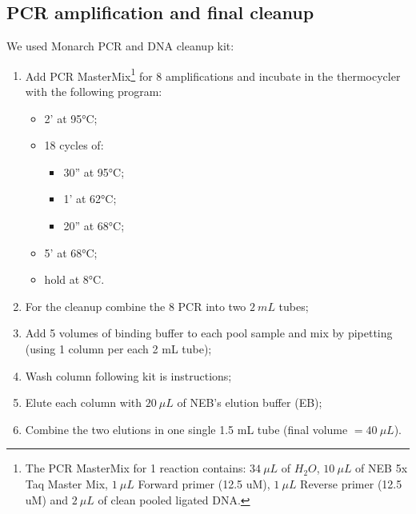 \documentclass[a4paper, 12pt]{report}
\begin{document}
\subsection{PCR amplification and final cleanup}
\vspace{-1em}
We used Monarch PCR and DNA cleanup kit:
\vspace{-1em}
\begin{enumerate}\setlength\itemsep{-0.2em}
	\item Add PCR MasterMix\footnote{The PCR MasterMix for 1 reaction contains: $34 \ \mu L$ of $H_2O$, $10 \ \mu L$ of NEB 5x Taq Master Mix, $1 \ \mu L$ Forward primer (12.5 uM), $1 \ \mu L$ Reverse primer (12.5 uM) and $2 \ \mu L$ of clean pooled ligated DNA.} for 8 amplifications and incubate in the thermocycler with the following program:
	\vspace{-0.7em}
	\begin{itemize}\setlength\itemsep{-0.2em}
		\item 2' at 95°C;
		\item 18 cycles of:
		\vspace{-0.7em}
		\begin{itemize}\setlength\itemsep{-0.2em}
			\item 30'' at 95°C;
			\item 1' at 62°C;
			\item 20'' at 68°C;
		\end{itemize}
		\item 5' at 68°C;
		\item hold at 8°C.
	\end{itemize}
	\item For the cleanup combine the 8 PCR into two $2 \ mL$ tubes;
	\item Add 5 volumes of binding buffer to each pool sample and mix by pipetting (using 1 column per each 2 mL tube);
	\item Wash column following kit is instructions;
	\item Elute each column with $20 \ \mu L$ of NEB's elution buffer (EB);
	\item Combine the two elutions in one single 1.5 mL tube (final volume $= 40 \ \mu L$).
\end{enumerate}
\end{document}
